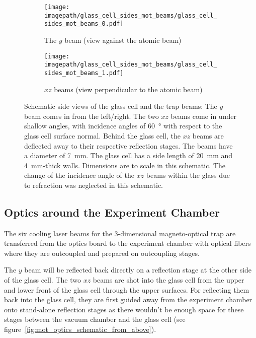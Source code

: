 \begin{figure}
    \centering
    \begin{subfigure}[t]{0.26\textwidth}
        \centering
        \texttt{[image: \\imagepath/glass\_cell\_sides\_mot\_beams/glass\_cell\_sides\_mot\_beams\_0.pdf]}
        \caption{The $y$ beam (view against the atomic beam)}\label{fig:glass_cell_sides_mot_beams_1}
    \end{subfigure}
    \hspace{0.07\textwidth}
    \begin{subfigure}[t]{0.66\textwidth}
        \centering
        \texttt{[image: \\imagepath/glass\_cell\_sides\_mot\_beams/glass\_cell\_sides\_mot\_beams\_1.pdf]}
        \caption{$xz$ beams (view perpendicular to the atomic beam)}\label{fig:glass_cell_sides_mot_beams_0}
    \end{subfigure}
    \caption{Schematic side views of the glass cell and the trap beams: The $y$ beam comes in from the left/right. The two $xz$ beams come in under shallow angles, with incidence angles of \SI{60}{\degree} with respect to the glass cell surface normal. Behind the glass cell, the $xz$ beams are deflected away to their respective reflection stages. The beams have a diameter of \SI{7}{\milli\meter}. The glass cell has a side length of \SI{20}{\milli\meter} and \SI{4}{\milli\meter}-thick walls. Dimensions are to scale in this schematic. The change of the incidence angle of the $xz$ beams within the glass due to refraction was neglected in this schematic.}
    \label{fig:glass_cell_sides_mot_beams}
\end{figure} 

\subsection*{Optics around the Experiment Chamber}
The six cooling laser beams for the 3-dimensional magneto-optical trap are transferred from the optics board to the experiment chamber with optical fibers where they are outcoupled and prepared on outcoupling stages. 

The $y$ beam will be reflected back directly on a reflection stage at the other side of the glass cell. The two $xz$ beams are shot into the glass cell from the upper and lower front of the glass cell through the upper surfaces. For reflecting them back into the glass cell, they are first guided away from the experiment chamber onto stand-alone reflection stages as there wouldn't be enough space for these stages between the vacuum chamber and the glass cell (see figure~\ref{fig:mot_optics_schematic_from_above}).

